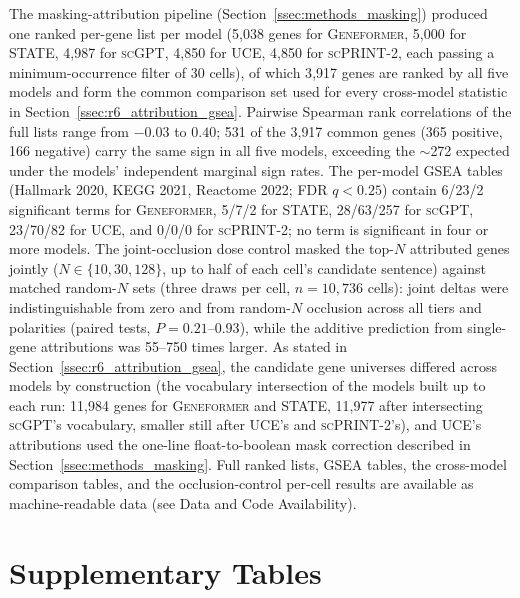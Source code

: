 \documentclass[11pt,a4paper]{article}
\newcommand{\model}[1]{\textsc{#1}}
\begin{document}
The masking-attribution pipeline (Section~\ref{ssec:methods_masking}) produced
one ranked per-gene list per model (5{,}038 genes for \model{Geneformer},
5{,}000 for \model{STATE}, 4{,}987 for \model{scGPT}, 4{,}850 for \model{UCE},
4{,}850 for \model{scPRINT-2}, each passing a minimum-occurrence filter of 30
cells), of which 3{,}917 genes are ranked by all five models and form the
common comparison set used for every cross-model statistic in
Section~\ref{ssec:r6_attribution_gsea}. Pairwise Spearman rank correlations
of the full lists range from $-0.03$ to $0.40$; 531 of the 3{,}917 common
genes (365 positive, 166 negative) carry the same sign in all five models,
exceeding the $\sim$272 expected under the models' independent marginal sign
rates. The per-model GSEA tables (Hallmark 2020, KEGG 2021, Reactome 2022;
FDR $q < 0.25$) contain 6/23/2 significant terms for \model{Geneformer},
5/7/2 for \model{STATE}, 28/63/257 for \model{scGPT}, 23/70/82 for
\model{UCE}, and 0/0/0 for \model{scPRINT-2}; no term is significant in four
or more models. The joint-occlusion dose control masked the top-$N$ attributed
genes jointly ($N \in \{10, 30, 128\}$, up to half of each cell's candidate
sentence) against matched random-$N$ sets (three draws per cell, $n = 10{,}736$
cells): joint deltas were indistinguishable from zero and from random-$N$
occlusion across all tiers and polarities (paired tests, $P = 0.21$--$0.93$),
while the additive prediction from single-gene attributions was 55--750 times
larger. As stated in Section~\ref{ssec:r6_attribution_gsea}, the candidate
gene universes differed across models by construction (the vocabulary
intersection of the models built up to each run: 11{,}984 genes for
\model{Geneformer} and \model{STATE}, 11{,}977 after intersecting
\model{scGPT}'s vocabulary, smaller still after \model{UCE}'s and
\model{scPRINT-2}'s), and \model{UCE}'s attributions used the one-line
float-to-boolean mask correction described in
Section~\ref{ssec:methods_masking}. Full ranked lists, GSEA tables, the
cross-model comparison tables, and the occlusion-control per-cell results are
available as machine-readable data (see Data and Code Availability).


\section{Supplementary Tables}
\end{document}
